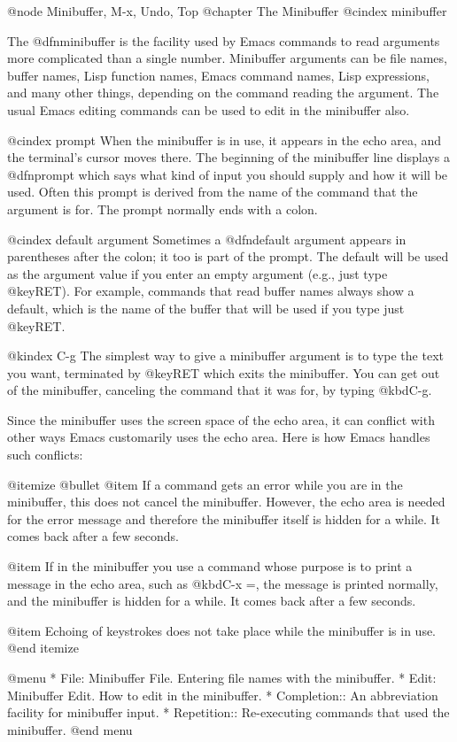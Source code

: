 {{{{{@node Minibuffer, M-x, Undo, Top
@chapter The Minibuffer
@cindex minibuffer

  The @dfn{minibuffer} is the facility used by Emacs commands to read
arguments more complicated than a single number.  Minibuffer arguments can
be file names, buffer names, Lisp function names, Emacs command names, Lisp
expressions, and many other things, depending on the command reading the
argument.  The usual Emacs editing commands can be used to edit in the
minibuffer also.

@cindex prompt
  When the minibuffer is in use, it appears in the echo area, and the
terminal's cursor moves there.  The beginning of the minibuffer line
displays a @dfn{prompt} which says what kind of input you should supply and
how it will be used.  Often this prompt is derived from the name of the
command that the argument is for.  The prompt normally ends with a colon.

@cindex default argument
  Sometimes a @dfn{default argument} appears in parentheses after the
colon; it too is part of the prompt.  The default will be used as the
argument value if you enter an empty argument (e.g., just type @key{RET}).
For example, commands that read buffer names always show a default, which
is the name of the buffer that will be used if you type just @key{RET}.

@kindex C-g
  The simplest way to give a minibuffer argument is to type the text you
want, terminated by @key{RET} which exits the minibuffer.  You can get out
of the minibuffer, canceling the command that it was for, by typing
@kbd{C-g}.

  Since the minibuffer uses the screen space of the echo area, it can
conflict with other ways Emacs customarily uses the echo area.  Here is how
Emacs handles such conflicts:

@itemize @bullet
@item
If a command gets an error while you are in the minibuffer, this does
not cancel the minibuffer.  However, the echo area is needed for the
error message and therefore the minibuffer itself is hidden for a
while.  It comes back after a few seconds.

@item
If in the minibuffer you use a command whose purpose is to print a
message in the echo area, such as @kbd{C-x =}, the message is printed
normally, and the minibuffer is hidden for a while.  It comes back
after a few seconds.

@item
Echoing of keystrokes does not take place while the minibuffer is in
use.
@end itemize

@menu
* File: Minibuffer File.  Entering file names with the minibuffer.
* Edit: Minibuffer Edit.  How to edit in the minibuffer.
* Completion::		  An abbreviation facility for minibuffer input.
* Repetition::		  Re-executing commands that used the minibuffer.
@end menu

}}}}}
